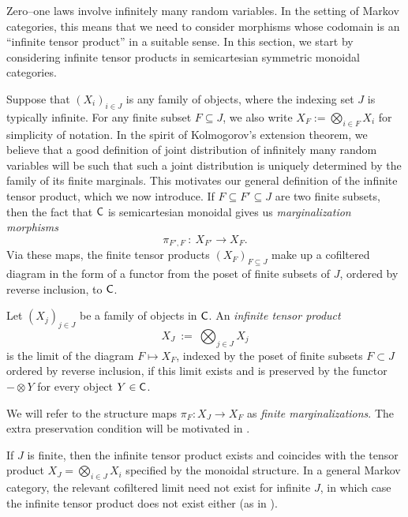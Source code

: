 \documentclass[11pt]{article}
\begin{document}
Zero--one laws involve infinitely many random variables. In the setting of Markov categories, this means that we need to consider morphisms whose codomain is an ``infinite tensor product'' in a suitable sense. In this section, we start by considering infinite tensor products in semicartesian symmetric monoidal categories.

Suppose that $(X_i)_{i \in J}$ is any family of objects, where the indexing set $J$ is typically infinite. For any finite subset $F \subseteq J$, we also write $X_F := \bigotimes_{i \in F} X_i$ for simplicity of notation. In the spirit of Kolmogorov's extension theorem, we believe that a good definition of joint distribution of infinitely many random variables will be such that such a joint distribution is uniquely determined by the family of its finite marginals. This motivates our general definition of the infinite tensor product, which we now introduce. If $F \subseteq F' \subseteq J$ are two finite subsets, then the fact that $\mathsf{C}$ is semicartesian monoidal gives us \emph{marginalization morphisms}
\[
	\pi_{F',F} \: : \: X_{F'} \longrightarrow X_F.
\]
Via these maps, the finite tensor products $(X_F)_{F \subseteq J}$ make up a cofiltered diagram in the form of a functor from the poset of finite subsets of $J$, ordered by reverse inclusion, to $\mathsf{C}$.

\begin{definition}
	\label{semicartesian_infproduct}
	Let $(X_j)_{j \in J}$ be a family of objects in $\mathsf{C}$. An \emph{infinite tensor product}
	\[
		X_J \: := \: \bigotimes_{j \in J} X_j
	\]
	is the limit of the diagram $F \mapsto X_F$, indexed by the poset of finite subsets $F \subset J$ ordered by reverse inclusion, if this limit exists and is preserved by the functor $- \otimes Y$ for every object $Y \in \mathsf{C}$.
\end{definition}

We will refer to the structure maps $\pi_F : X_J \to X_F$ as \emph{finite marginalizations}. The extra preservation condition will be motivated in .

\begin{remark}
	If $J$ is finite, then the infinite tensor product exists and coincides with the tensor product $X_J = \bigotimes_{i \in J} X_i$ specified by the monoidal structure. In a general Markov category, the relevant cofiltered limit need not exist for infinite $J$, in which case the infinite tensor product does not exist either (as in ).
\end{remark}
\end{document}
